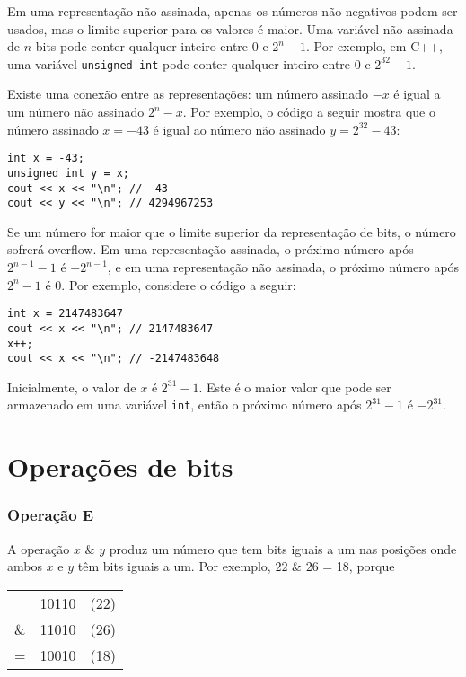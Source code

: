 Em uma representação não assinada, apenas os números não negativos
podem ser usados, mas o limite superior para os valores é maior.
Uma variável não assinada de $n$ bits pode conter qualquer
inteiro entre $0$ e $2^n-1$.
Por exemplo, em C++, uma variável \texttt{unsigned int}
pode conter qualquer inteiro entre $0$ e $2^{32}-1$.

Existe uma conexão entre as
representações:
um número assinado $-x$ é igual a um número não assinado $2^n-x$.
Por exemplo, o código a seguir mostra que
o número assinado $x=-43$ é igual ao número não assinado
$y=2^{32}-43$:
\begin{lstlisting}
int x = -43;
unsigned int y = x;
cout << x << "\n"; // -43
cout << y << "\n"; // 4294967253
\end{lstlisting}

Se um número for maior que o limite superior
da representação de bits, o número sofrerá overflow.
Em uma representação assinada,
o próximo número após $2^{n-1}-1$ é $-2^{n-1}$,
e em uma representação não assinada,
o próximo número após $2^n-1$ é $0$.
Por exemplo, considere o código a seguir:
\begin{lstlisting}
int x = 2147483647
cout << x << "\n"; // 2147483647
x++;
cout << x << "\n"; // -2147483648
\end{lstlisting}

Inicialmente, o valor de $x$ é $2^{31}-1$.
Este é o maior valor que pode ser armazenado
em uma variável \texttt{int},
então o próximo número após $2^{31}-1$ é $-2^{31}$.


\section{Operações de bits}

\newcommand\XOR{\mathbin{\char`\^}}

\subsubsection{Operação E}


A operação  $x$ \& $y$ produz um número
que tem bits iguais a um nas posições onde ambos
$x$ e $y$ têm bits iguais a um.
Por exemplo, $22$ \& $26$ = 18, porque

\begin{center}
\begin{tabular}{rrr}
& 10110 & (22)\\
\& & 11010 & (26) \\
\hline
 = & 10010 & (18) \\
\end{tabular}
\end{center}

